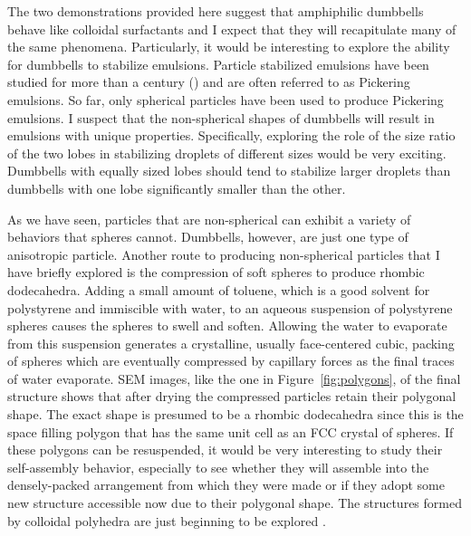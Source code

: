 The two demonstrations provided here suggest that amphiphilic dumbbells behave like colloidal surfactants and I expect that they will recapitulate many of the same phenomena.
Particularly, it would be interesting to explore the ability for dumbbells to stabilize emulsions.
Particle stabilized emulsions have been studied for more than a century (\cite{Ramsden:1903, Pickering:1907}) and are often referred to as Pickering emulsions.
So far, only spherical particles have been used to produce Pickering emulsions.
I suspect that the non-spherical shapes of dumbbells will result in emulsions with unique properties. Specifically, exploring the role of the size ratio of the two lobes in stabilizing droplets of different sizes would be very exciting.
Dumbbells with equally sized lobes should tend to stabilize larger droplets than dumbbells with one lobe significantly smaller than the other.


As we have seen, particles that are non-spherical can exhibit a variety of behaviors that spheres cannot.
Dumbbells, however, are just one type of anisotropic particle.
Another route to producing non-spherical particles that I have briefly explored is the compression of soft spheres to produce rhombic dodecahedra.
Adding a small amount of toluene, which is a good solvent for polystyrene and immiscible with water, to an aqueous suspension of polystyrene spheres causes the spheres to swell and soften.
Allowing the water to evaporate from this suspension generates a crystalline, usually face-centered cubic, packing of spheres which are eventually compressed by capillary forces as the final traces of water evaporate.
SEM images, like the one in Figure~\ref{fig:polygons}, of the final structure shows that after drying the compressed particles retain their polygonal shape.
The exact shape is presumed to be a rhombic dodecahedra since this is the space filling polygon that has the same unit cell as an FCC crystal of spheres.
If these polygons can be resuspended, it would be very interesting to study their self-assembly behavior, especially to see whether they will assemble into the densely-packed arrangement from which they were made or if they adopt some new structure accessible now due to their polygonal shape.
The structures formed by colloidal polyhedra are just beginning to be explored \cite{Henzie:2011}.


